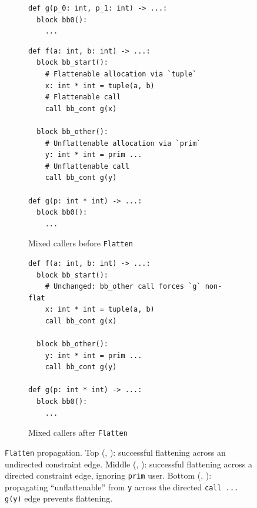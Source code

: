 \begin{figure}[htbp]
\begin{subfigure}[t]{0.48\textwidth}
\begin{verbatim}
def g(p_0: int, p_1: int) -> ...:
  block bb0():
    ...
\end{verbatim}
  \end{subfigure}

  \vspace{1mm}

  \begin{subfigure}[t]{0.48\textwidth}
    \caption{Mixed callers before \texttt{Flatten}}
    \label{fig:true_flat_mixed_callers_before}
\begin{verbatim}
def f(a: int, b: int) -> ...:
  block bb_start():
    # Flattenable allocation via `tuple`
    x: int * int = tuple(a, b)
    # Flattenable call
    call bb_cont g(x)

  block bb_other():
    # Unflattenable allocation via `prim`
    y: int * int = prim ...
    # Unflattenable call
    call bb_cont g(y)

def g(p: int * int) -> ...:
  block bb0():
    ...
\end{verbatim}
  \end{subfigure}\hfill
  \begin{subfigure}[t]{0.48\textwidth}
    \caption{Mixed callers after \texttt{Flatten}}
    \label{fig:true_flat_mixed_callers_after}
\begin{verbatim}
def f(a: int, b: int) -> ...:
  block bb_start():
    # Unchanged: bb_other call forces `g` non-flat
    x: int * int = tuple(a, b)
    call bb_cont g(x)

  block bb_other():
    y: int * int = prim ...
    call bb_cont g(y)

def g(p: int * int) -> ...:
  block bb0():
    ...
\end{verbatim}
  \end{subfigure}

\caption{\texttt{Flatten} propagation. Top
  (, ):
  successful flattening across an undirected constraint edge.
  Middle (, ):
  successful flattening across a directed constraint edge,
  ignoring \texttt{prim} user.
  Bottom
  (, ):
  propagating ``unflattenable'' from \texttt{y} across the directed \texttt{call ... g(y)} edge prevents flattening.}
  \label{fig:true_flat_mixed_case}
\end{figure}
\FloatBarrier

